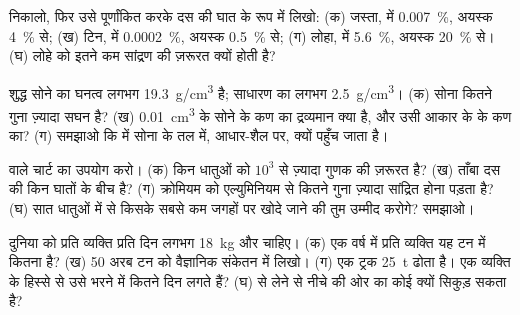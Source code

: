 \begin{exercise}[$\star\star$]\label{exo:g9:earth-resources:5}
 निकालो, फिर उसे पूर्णांकित करके दस की घात के रूप में लिखो:
(क) जस्ता,  में \qty{0.007}{\%}, अयस्क \qty{4}{\%} से; (ख) टिन,
 में \qty{0.0002}{\%}, अयस्क \qty{0.5}{\%} से; (ग) लोहा,
 में \qty{5.6}{\%}, अयस्क \qty{20}{\%} से। (घ) लोहे को इतने कम सांद्रण की ज़रूरत
क्यों होती है?
\end{exercise}

\begin{exercise}[$\star\star$]\label{exo:g9:earth-resources:6}
शुद्ध सोने का घनत्व लगभग \qty{19.3}{g/cm^3} है; साधारण  का लगभग
\qty{2.5}{g/cm^3}। (क) सोना कितने गुना ज़्यादा सघन है? (ख) \qty{0.01}{cm^3} के सोने
के कण का द्रव्यमान क्या है, और उसी आकार के  के कण का? (ग) समझाओ कि  में सोना
 के तल में, आधार-शैल पर, क्यों पहुँच जाता
है।
\end{exercise}

\begin{exercise}[$\star\star$]\label{exo:g9:earth-resources:7}
 वाले चार्ट का उपयोग करो। (क) किन धातुओं को $10^3$ से ज़्यादा गुणक की ज़रूरत
है? (ख) ताँबा दस की किन घातों के बीच है? (ग) क्रोमियम को एल्युमिनियम से कितने गुना ज़्यादा
सांद्रित होना पड़ता है? (घ) सात धातुओं में से किसके सबसे कम जगहों पर खोदे जाने की तुम उम्मीद
करोगे? समझाओ।
\end{exercise}

\begin{exercise}[$\star\star$]\label{exo:g9:earth-resources:8}
दुनिया को प्रति व्यक्ति प्रति दिन लगभग \qty{18}{kg}  और  चाहिए। (क) एक वर्ष में
प्रति व्यक्ति यह टन में कितना है? (ख) 50 अरब टन को वैज्ञानिक संकेतन में लिखो।
(ग) एक ट्रक \qty{25}{t} ढोता है। एक व्यक्ति के हिस्से से उसे भरने में कितने दिन लगते
हैं? (घ)  से  लेने से नीचे की ओर का कोई   क्यों सिकुड़ सकता
है?
\end{exercise}

